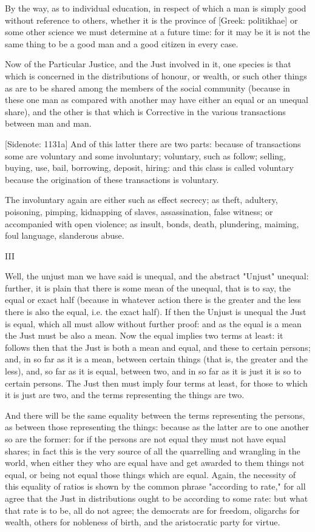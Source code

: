 By the way, as to individual education, in respect of which a man is
simply good without reference to others, whether it is the province of
[Greek: politikhae] or some other science we must determine at a
future time: for it may be it is not the same thing to be a good man and
a good citizen in every case.

Now of the Particular Justice, and the Just involved in it, one species
is that which is concerned in the distributions of honour, or wealth, or
such other things as are to be shared among the members of the social
community (because in these one man as compared with another may have
either an equal or an unequal share), and the other is that which is
Corrective in the various transactions between man and man.

[Sidenote: 1131a] And of this latter there are two parts: because of
transactions some are voluntary and some involuntary; voluntary, such as
follow; selling, buying, use, bail, borrowing, deposit, hiring: and this
class is called voluntary because the origination of these transactions
is voluntary.

The involuntary again are either such as effect secrecy; as theft,
adultery, poisoning, pimping, kidnapping of slaves, assassination, false
witness; or accompanied with open violence; as insult, bonds, death,
plundering, maiming, foul language, slanderous abuse.

III

Well, the unjust man we have said is unequal, and the abstract "Unjust"
unequal: further, it is plain that there is some mean of the unequal,
that is to say, the equal or exact half (because in whatever action
there is the greater and the less there is also the equal, i.e. the
exact half). If then the Unjust is unequal the Just is equal, which all
must allow without further proof: and as the equal is a mean the Just
must be also a mean. Now the equal implies two terms at least: it
follows then that the Just is both a mean and equal, and these to
certain persons; and, in so far as it is a mean, between certain things
(that is, the greater and the less), and, so far as it is equal, between
two, and in so far as it is just it is so to certain persons. The Just
then must imply four terms at least, for those to which it is just are
two, and the terms representing the things are two.

And there will be the same equality between the terms representing the
persons, as between those representing the things: because as the latter
are to one another so are the former: for if the persons are not equal
they must not have equal shares; in fact this is the very source of all
the quarrelling and wrangling in the world, when either they who are
equal have and get awarded to them things not equal, or being not equal
those things which are equal. Again, the necessity of this equality of
ratios is shown by the common phrase "according to rate," for all agree
that the Just in distributions ought to be according to some rate:
but what that rate is to be, all do not agree; the democrats are for
freedom, oligarchs for wealth, others for nobleness of birth, and the
aristocratic party for virtue.


